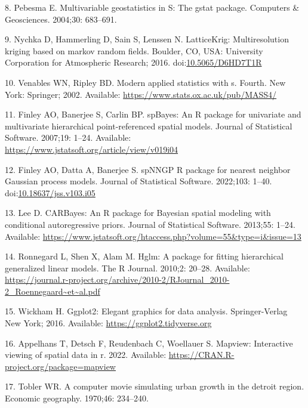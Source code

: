 \documentclass[10pt,letterpaper]{article}
\begin{document}
\leavevmode\hypertarget{ref-pebesma2004gstat}{}%
8. Pebesma E. Multivariable geostatistics in S: The gstat package.
Computers \& Geosciences. 2004;30: 683--691.

\leavevmode\hypertarget{ref-nychka2016latticekrig}{}%
9. Nychka D, Hammerling D, Sain S, Lenssen N. LatticeKrig:
Multiresolution kriging based on markov random fields. Boulder, CO, USA:
University Corporation for Atmospheric Research; 2016.
doi:\href{https://doi.org/10.5065/D6HD7T1R}{10.5065/D6HD7T1R}

\leavevmode\hypertarget{ref-venables2002S}{}%
10. Venables WN, Ripley BD. Modern applied statistics with s. Fourth.
New York: Springer; 2002. Available:
\url{https://www.stats.ox.ac.uk/pub/MASS4/}

\leavevmode\hypertarget{ref-finley2007spbayes}{}%
11. Finley AO, Banerjee S, Carlin BP. spBayes: An R package for
univariate and multivariate hierarchical point-referenced spatial
models. Journal of Statistical Software. 2007;19: 1--24. Available:
\url{https://www.jstatsoft.org/article/view/v019i04}

\leavevmode\hypertarget{ref-finley2002spnngp}{}%
12. Finley AO, Datta A, Banerjee S. spNNGP R package for nearest
neighbor Gaussian process models. Journal of Statistical Software.
2022;103: 1--40.
doi:\href{https://doi.org/10.18637/jss.v103.i05}{10.18637/jss.v103.i05}

\leavevmode\hypertarget{ref-lee2013carbayes}{}%
13. Lee D. CARBayes: An R package for Bayesian spatial modeling with
conditional autoregressive priors. Journal of Statistical Software.
2013;55: 1--24. Available:
\url{https://www.jstatsoft.org/htaccess.php?volume=55\&type=i\&issue=13}

\leavevmode\hypertarget{ref-ronnegard2010hglm}{}%
14. Ronnegard L, Shen X, Alam M. Hglm: A package for fitting
hierarchical generalized linear models. The R Journal. 2010;2: 20--28.
Available:
\url{https://journal.r-project.org/archive/2010-2/RJournal_2010-2_Roennegaard~et~al.pdf}

\leavevmode\hypertarget{ref-wickham2016ggplot2}{}%
15. Wickham H. Ggplot2: Elegant graphics for data analysis.
Springer-Verlag New York; 2016. Available:
\url{https://ggplot2.tidyverse.org}

\leavevmode\hypertarget{ref-appelhans2022mapview}{}%
16. Appelhans T, Detsch F, Reudenbach C, Woellauer S. Mapview:
Interactive viewing of spatial data in r. 2022. Available:
\url{https://CRAN.R-project.org/package=mapview}

\leavevmode\hypertarget{ref-tobler1970computer}{}%
17. Tobler WR. A computer movie simulating urban growth in the detroit
region. Economic geography. 1970;46: 234--240.
\end{document}

